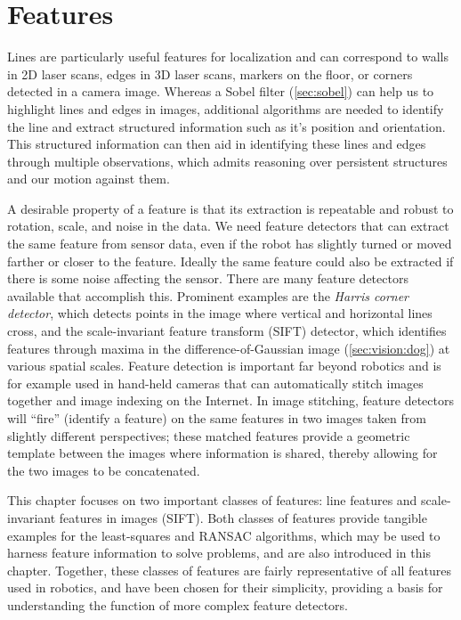 \section{Features}
Lines are particularly useful features for localization and can correspond to walls in 2D laser scans, edges in 3D laser scans, markers on the floor, or corners detected in a camera image. Whereas a Sobel filter (\cref{sec:sobel}) can help us to highlight lines and edges in images, additional algorithms are needed to identify the line and extract structured information such as it's position and orientation. This structured information can then aid in identifying these lines and edges through multiple observations, which admits reasoning over persistent structures and our motion against them.

A desirable property of a feature is that its extraction is repeatable and robust to rotation, scale, and noise in the data. We need feature detectors that can extract the same feature from sensor data, even if the robot has slightly turned or moved farther or closer to the feature. Ideally the same feature could also be extracted if there is some noise affecting the sensor. There are many feature detectors available that accomplish this. Prominent examples are the \emph{Harris corner detector}, which detects points in the image where vertical and horizontal lines cross, and the scale-invariant feature transform (SIFT) detector, which identifies features through maxima in the difference-of-Gaussian image (\cref{sec:vision:dog}) at various spatial scales. Feature detection is important far beyond robotics and is for example used in hand-held cameras that can automatically stitch images together and image indexing on the Internet. In image stitching, feature detectors will ``fire'' (identify a feature) on the same features in two images taken from slightly different perspectives; these matched features provide a geometric template between the images where information is shared, thereby allowing for the two images to be concatenated.

This chapter focuses on two important classes of features: line features and scale-invariant features in images (SIFT). Both classes of features provide tangible examples for the least-squares and RANSAC algorithms, which may be used to harness feature information to solve problems, and are also introduced in this chapter. Together, these classes of features are fairly representative of all features used in robotics, and have been chosen for their simplicity, providing a basis for understanding the function of more complex feature detectors.

